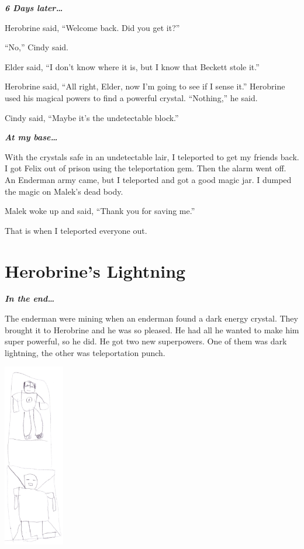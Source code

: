 \documentclass[letterpaper, oneside, 12pt]{krantz}
\begin{document}
\textbf{\emph{6 Days later\ldots{}}}

Herobrine said, ``Welcome back. Did you get it?''

``No,'' Cindy said.

Elder said, ``I don't know where it is, but I know that Beckett stole
it.''

Herobrine said, ``All right, Elder, now I'm going to see if I sense
it.'' Herobrine used his magical powers to find a powerful crystal.
``Nothing,'' he said.

Cindy said, ``Maybe it's the undetectable block.''

\textbf{\emph{At my base\ldots{}}}

With the crystals safe in an undetectable lair, I teleported to get my
friends back. I got Felix out of prison using the teleportation gem.
Then the alarm went off. An Enderman army came, but I teleported and got
a good magic jar. I dumped the magic on Malek's dead body.

Malek woke up and said, ``Thank you for saving me.''

That is when I teleported everyone out.

\hypertarget{herobrines-lightning}{%
\section{Herobrine's Lightning}\label{herobrines-lightning}}

\textbf{\emph{In the end\ldots{}}}

The enderman were mining when an enderman found a dark energy crystal.
They brought it to Herobrine and he was so pleased. He had all he wanted
to make him super powerful, so he did. He got two new superpowers. One
of them was dark lightning, the other was teleportation punch.

\includegraphics[width=1.04167in,height=\textheight]{img/final-war/dark-lightning.jpg}
\end{document}
